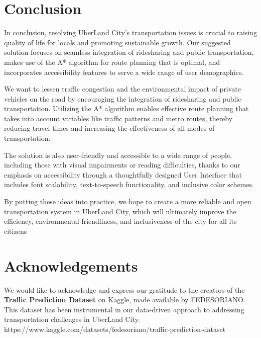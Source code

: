 \documentclass{article}
\begin{document}
\section{Conclusion}
In conclusion, resolving UberLand City's transportation issues is crucial to raising quality of life for locals and promoting sustainable growth. Our suggested solution focuses on seamless integration of ridesharing and public transportation, makes use of the A* algorithm for route planning that is optimal, and incorporates accessibility features to serve a wide range of user demographics.

We want to lessen traffic congestion and the environmental impact of private vehicles on the road by encouraging the integration of ridesharing and public transportation. Utilizing the A* algorithm enables effective route planning that takes into account variables like traffic patterns and metro routes, thereby reducing travel times and increasing the effectiveness of all modes of transportation.

The solution is also user-friendly and accessible to a wide range of people, including those with visual impairments or reading difficulties, thanks to our emphasis on accessibility through a thoughtfully designed User Interface that includes font scalability, text-to-speech functionality, and inclusive color schemes.

By putting these ideas into practice, we hope to create a more reliable and open transportation system in UberLand City, which will ultimately improve the efficiency, environmental friendliness, and inclusiveness of the city for all its citizens

\section{Acknowledgements}

We would like to acknowledge and express our gratitude to the creators of the \textbf{Traffic Prediction Dataset} on Kaggle, made available by FEDESORIANO. This dataset has been instrumental in our data-driven approach to addressing transportation challenges in UberLand City.
https://www.kaggle.com/datasets/fedesoriano/traffic-prediction-dataset
\end{document}
